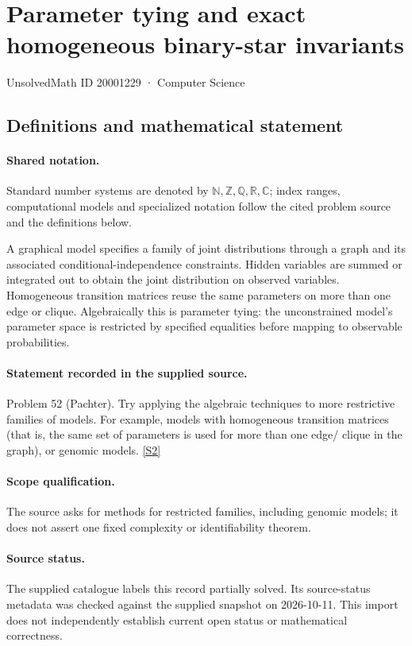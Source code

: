 \documentclass[11pt]{article}
\newcommand{\sref}[2]{\hyperlink{source:#1:#2}{[S#2]}}
\begin{document}
\setcounter{section}{20001228}
\section{Parameter tying and exact homogeneous binary-star invariants}\label{20001229}
{\small\sffamily UnsolvedMath ID 20001229 · Computer Science}
\subsection{Definitions and mathematical statement}

\paragraph{Shared notation.}Standard number systems are denoted by $\mathbb N,\mathbb Z,\mathbb Q,\mathbb R,\mathbb C$; index ranges, computational models and specialized notation follow the cited problem source and the definitions below.


A graphical model specifies a family of joint distributions through a graph and its associated conditional-independence constraints. Hidden variables are summed or integrated out to obtain the joint distribution on observed variables. Homogeneous transition matrices reuse the same parameters on more than one edge or clique. Algebraically this is parameter tying: the unconstrained model's parameter space is restricted by specified equalities before mapping to observable probabilities.
\paragraph{Statement recorded in the supplied source.}
Problem 52 (Pachter). Try applying the algebraic techniques to more restrictive families of models. For example, models with homogeneous transition matrices (that is, the same set of parameters is used for more than one edge/ clique in the graph), or genomic models. \sref{20001229}{2}
\paragraph{Scope qualification.}
The source asks for methods for restricted families, including genomic models; it does not assert one fixed complexity or identifiability theorem.
\paragraph{Source status.}
The supplied catalogue labels this record partially solved. Its source-status metadata was checked against the supplied snapshot on 2026-10-11. This import does not independently establish current open status or mathematical correctness.
\end{document}
